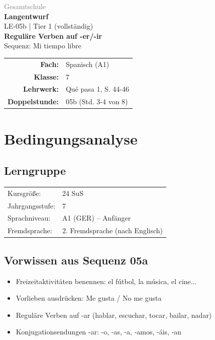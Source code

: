 \documentclass[11pt,a4paper]{article}
\newcommand{\fach}{Spanisch}
\newcommand{\jahrgangsstufe}{7}
\newcommand{\schulart}{Gesamtschule}
\newcommand{\stundenthema}{Reguläre Verben auf -er/-ir}
\newcommand{\reihenthema}{Mi tiempo libre}
\newcommand{\stundennummer}{05b}
\newcommand{\gerniveau}{A1}
\newcommand{\lehrwerk}{Qué pasa 1}
\newcommand{\lehrwerkseite}{S. 44-46}
\newcommand{\lerngruppengroesse}{24}
\begin{document}
\begin{titlepage}
    \centering
    \vspace*{2cm}
    {\large\textcolor{gray}{\schulart}}\\[2cm]
    {\Huge\textcolor{fach}{\textbf{Langentwurf}}}\\[0.5cm]
    {\large LE-\stundennummer{} | Tier 1 (vollständig)}\\[2cm]
    {\LARGE\textbf{\stundenthema}}\\[0.5cm]
    {\large Sequenz: \reihenthema}\\[2cm]
    \begin{tabular}{rl}
        \textbf{Fach:} & \fach{} (\gerniveau) \\[0.3cm]
        \textbf{Klasse:} & \jahrgangsstufe \\[0.3cm]
        \textbf{Lehrwerk:} & \lehrwerk, \lehrwerkseite \\[0.3cm]
        \textbf{Doppelstunde:} & \stundennummer{} (Std. 3-4 von 8) \\[0.3cm]
    \end{tabular}
    \vfill
\end{titlepage}

\tableofcontents
\newpage

\section{Bedingungsanalyse}

\subsection{Lerngruppe}
\begin{tabular}{ll}
    Kursgröße: & \lerngruppengroesse{} SuS \\
    Jahrgangsstufe: & \jahrgangsstufe \\
    Sprachniveau: & \gerniveau{} (GER) -- Anfänger \\
    Fremdsprache: & 2. Fremdsprache (nach Englisch) \\
\end{tabular}

\subsection{Vorwissen aus Sequenz 05a}
\begin{itemize}
    \item Freizeitaktivitäten benennen: el fútbol, la música, el cine...
    \item Vorlieben ausdrücken: Me gusta / No me gusta
    \item Reguläre Verben auf -ar (hablar, escuchar, tocar, bailar, nadar)
    \item Konjugationsendungen -ar: -o, -as, -a, -amos, -áis, -an
\end{itemize}
\end{document}
